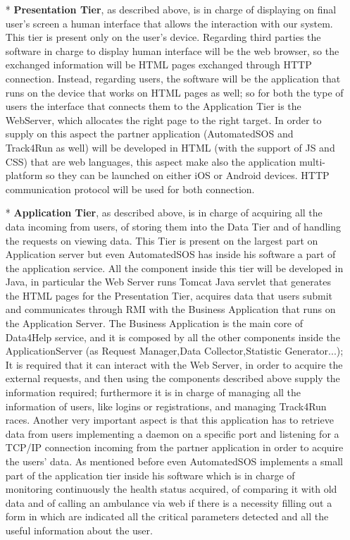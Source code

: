 \begin{enumerate}
\begin{enumerate}
		\begin{enumerate}
		\item[*] \textbf{Presentation Tier}, as described above, is in charge of displaying on final user's screen a human interface that allows the interaction with our system. This tier is present only on the user's device. Regarding third parties the software in charge to display human interface will be the web browser, so the exchanged information will be HTML pages exchanged through HTTP connection. Instead, regarding users, the software will be the application that runs on the device that works on HTML pages as well; so for both the type of users the interface that connects them to the Application Tier is the WebServer, which allocates the right page to the right target. In order to supply on this aspect the partner application (AutomatedSOS and Track4Run as well) will be developed in HTML (with the support of JS and CSS) that are web languages, this aspect make also the application multi-platform so they can be launched on either iOS or Android devices. HTTP communication protocol will be used for both connection.
		\item[*] \textbf{Application Tier}, as described above, is in charge of acquiring all the data incoming from users, of storing them into the Data Tier and of handling the requests on viewing data. This Tier is present on the largest part on Application server but even AutomatedSOS has inside his software a part of the application service. All the component inside this tier will be developed in Java, in particular the Web Server runs Tomcat Java servlet that generates the HTML pages for the Presentation Tier, acquires data that users submit and communicates through RMI with the Business Application that runs on the Application Server. The Business Application is the main core of Data4Help service, and it is composed by all the other components inside the ApplicationServer (as Request Manager,Data Collector,Statistic Generator...); It is required that it can interact with the Web Server, in order to acquire the external requests, and then using the components described above supply the information required; furthermore it is in charge of managing all the information of users, like logins or registrations, and managing Track4Run races. Another very important aspect is that this application has to retrieve data from users implementing a daemon on a specific port and listening for a TCP/IP connection incoming from the partner application in order to acquire the users' data. As mentioned before even AutomatedSOS implements a small part of the application tier inside his software which is in charge of monitoring continuously the health status acquired, of comparing it with old data and of calling an ambulance via web if there is a necessity filling out a form in which are indicated all the critical parameters detected and all the useful information about the user.
		

\end{enumerate}
\end{enumerate}
\end{enumerate}

